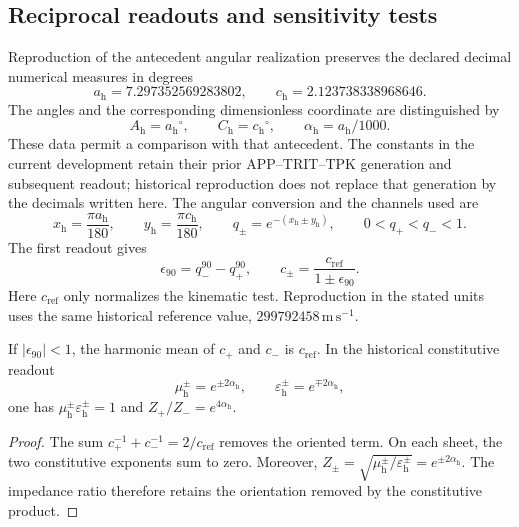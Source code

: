 \subsection{Reciprocal readouts and sensitivity tests}
\label{iii:hist:n6d}

Reproduction of the antecedent angular realization preserves the declared
decimal numerical measures in degrees
\[
 a_{\mathrm h}=7.297352569283802,\qquad
 c_{\mathrm h}=2.123738338968646.
\]
The angles and the corresponding dimensionless coordinate are distinguished by
\[
 A_{\mathrm h}=a_{\mathrm h}{}^\circ,\qquad
 C_{\mathrm h}=c_{\mathrm h}{}^\circ,\qquad
 \alpha_{\mathrm h}=a_{\mathrm h}/1000.
\]
These data permit a comparison with that antecedent. The constants in the
current development retain their prior APP--TRIT--TPK generation and
subsequent readout; historical reproduction does not replace that
generation by the decimals written here. The angular conversion and the
channels used are
\[
 x_{\mathrm h}=\frac{\pi a_{\mathrm h}}{180},\qquad
 y_{\mathrm h}=\frac{\pi c_{\mathrm h}}{180},\qquad
 q_\pm=e^{-(x_{\mathrm h}\pm y_{\mathrm h})},
 \qquad0<q_+<q_-<1.
\]
The first readout gives
\[
 \epsilon_{90}=q_-^{90}-q_+^{90},\qquad
 c_\pm=\frac{c_{\mathrm{ref}}}{1\pm\epsilon_{90}}.
\]
Here $c_{\mathrm{ref}}$ only normalizes the kinematic test. Reproduction
in the stated units uses the same historical reference value,
$299792458\,\mathrm{m\,s^{-1}}$.

\begin{proposition}
\label{iii:hist:lectores}
If $|\epsilon_{90}|<1$, the harmonic mean of $c_+$ and $c_-$ is
$c_{\mathrm{ref}}$. In the historical constitutive readout
\[
 \mu_{\mathrm h}^{\pm}=e^{\pm2\alpha_{\mathrm h}},\qquad
 \varepsilon_{\mathrm h}^{\pm}=e^{\mp2\alpha_{\mathrm h}},
\]
one has $\mu_{\mathrm h}^{\pm}\varepsilon_{\mathrm h}^{\pm}=1$ and
$Z_+/Z_-=e^{4\alpha_{\mathrm h}}$.
\end{proposition}
\begin{proof}
The sum $c_+^{-1}+c_-^{-1}=2/c_{\mathrm{ref}}$ removes the oriented term.
On each sheet, the two constitutive exponents sum to zero. Moreover,
$Z_\pm=\sqrt{\mu_{\mathrm h}^{\pm}/\varepsilon_{\mathrm h}^{\pm}}
=e^{\pm2\alpha_{\mathrm h}}$. The impedance ratio therefore retains
the orientation removed by the constitutive product.
\end{proof}

